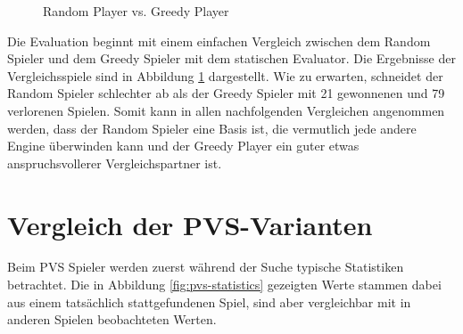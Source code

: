 \begin{figure}[!ht]
    \centering
    \caption{Random Player vs. Greedy Player}
    \label{fig:random-greedy-comparison}
\end{figure}

Die Evaluation beginnt mit einem einfachen Vergleich zwischen dem Random Spieler und dem Greedy Spieler mit dem statischen Evaluator. Die Ergebnisse der Vergleichsspiele sind in Abbildung \ref{fig:random-greedy-comparison} dargestellt. Wie zu erwarten, schneidet der Random Spieler schlechter ab als der Greedy Spieler mit 21 gewonnenen und 79 verlorenen Spielen. Somit kann in allen nachfolgenden Vergleichen angenommen werden, dass der Random Spieler eine Basis ist, die vermutlich jede andere Engine überwinden kann und der Greedy Player ein guter etwas anspruchsvollerer Vergleichspartner ist.

\section{Vergleich der PVS-Varianten}

Beim \ac{PVS} Spieler werden zuerst während der Suche typische Statistiken betrachtet. Die in Abbildung \ref{fig:pvs-statistics} gezeigten Werte stammen dabei aus einem tatsächlich stattgefundenen Spiel, sind aber vergleichbar mit in anderen Spielen beobachteten Werten.

